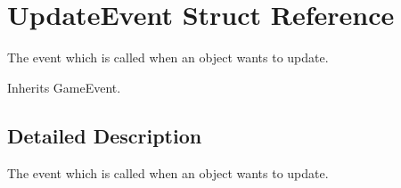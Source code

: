 \hypertarget{struct_update_event}{\section{Update\-Event Struct Reference}
\label{struct_update_event}
}


The event which is called when an object wants to update.  




Inherits Game\-Event.



\subsection{Detailed Description}
The event which is called when an object wants to update. 


